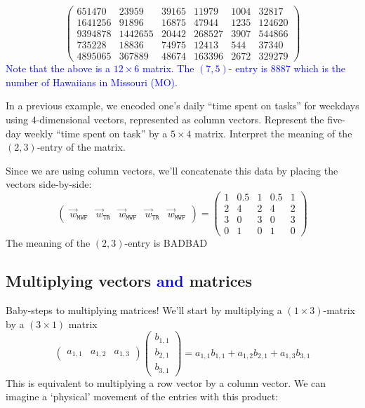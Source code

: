 \documentclass{ximera}
\begin{document}
\begin{example}
\begin{explanation}
\[\begin{pmatrix}
  651470 & 23959 & 39165 & 11979 & 1004 & 32817\\
  1641256 & 91896 & 16875 & 47944 & 1235 & 124620\\
  9394878 & 1442655 & 20442 & 268527 & 3907 & 544866\\
  735228 & 18836 & 74975 & 12413 & 544 & 37340\\
  4895065 & 367889 & 48674 & 163396 & 2672 & 329279
  \end{pmatrix}
  \]
  \textcolor{blue}{Note that the above is a $12\times 6$ matrix. The $(7, 5)$- entry is $8887$ which is the number of Hawaiians in Missouri (MO).}
  \end{explanation}
\end{example}

\begin{example}
  In a previous example, we encoded one's daily ``time spent on
  tasks'' for weekdays using $4$-dimensional vectors, represented as
  column vectors. Represent the five-day weekly ``time spent on task''
  by a $5\times 4$ matrix. Interpret the meaning of the $(2,3)$-entry
  of the matrix.
  \begin{explanation}
    Since we are using column vectors, we'll concatenate this data by
    placing the vectors side-by-side:
    \[
    \begin{pmatrix}
      \vec{w}_{\texttt{MWF}} & \vec{w}_{\texttt{TR}} & \vec{w}_{\texttt{MWF}} & \vec{w}_{\texttt{TR}} & \vec{w}_{\texttt{MWF}}
    \end{pmatrix}
    =
    \begin{pmatrix}
      1 & 0.5 & 1 & 0.5 & 1 \\
      2 & 4   & 2 & 4   & 2 \\
      3 & 0   & 3 & 0   & 3 \\
      0 & 1   & 0 & 1   & 0
    \end{pmatrix}
    \]
    The meaning of the $(2,3)$-entry is BADBAD
  \end{explanation}
\end{example}







\subsection{Multiplying vectors \textcolor{blue}{and} matrices}

Baby-steps to multiplying matrices! We'll start by multiplying a $(1\times 3)$-matrix by a $(3\times 1)$ matrix
\[
\begin{pmatrix} a_{1,1} & a_{1,2} & a_{1,3} \end{pmatrix}
\begin{pmatrix} b_{1,1} \\ b_{2,1} \\ b_{3,1} \end{pmatrix} = a_{1,1}b_{1,1} + a_{1,2}b_{2,1} + a_{1,3}b_{3,1}
\]
This is equivalent to multiplying a row vector by a column vector. We
can imagine a `physical' movement of the entries with this product:
\end{document}
